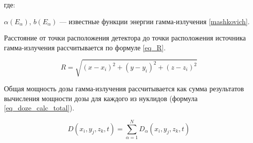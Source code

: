 где:
\begin{description}
    \item $\alpha(E_{\alpha})$, $b (E_{\alpha}) $ --- известные функции энергии гамма-излучения \ref{mashkovich}.
\end{description}

Расстояние от точки расположения детектора до точки расположения источника гамма-излучения рассчитывается по формуле
\ref{eq_R}.

\begin{equation}
    \label{eq_R}
    R = \sqrt{(x - x_i)^2 + (y - y_i)^2 + (z - z_i)^2}
\end{equation}

Общая мощность дозы гамма-излучения рассчитывается как сумма результатов вычисления мощности дозы для каждого из
нуклидов (формула \ref{eq_doze_calc_total}).

\begin{equation}
    \label{eq_doze_calc_total}
    D(x_i, y_j, z_k, t) = \sum_{\alpha = 1}^{N} D_{\alpha} (x_i, y_j, z_k, t)
\end{equation}